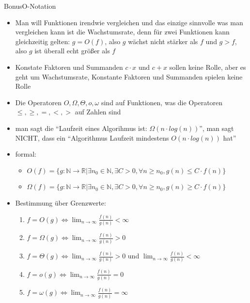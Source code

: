\begin{frame}[allowframebreaks]{Bonus}{O-Notation}
  \begin{itemize}
    \item Man will Funktionen irendwie vergleichen und das einzige sinnvolle was man vergleichen kann ist die \alert{Wachstumsrate}, denn für zwei Funktionen kann gleichzeitig gelten: $g = O(f)$, also $g$ wächst nicht stärker als $f$ und $g > f$, also $g$ ist überall echt größer als $f$
    \item Konstate Faktoren und Summanden $c \cdot x$ und $c + x$ sollen keine Rolle, aber es geht um \alert{Wachstumsrate}, Konstante Faktoren und Summanden spielen keine Rolle
    \item Die Operatoren $O, \Omega, \Theta, o, \omega$ sind auf Funktionen, was die Operatoren $\le, \ge, =, <, >$ auf Zahlen sind
    \item man sagt die \enquote{Laufzeit eines Algorihmus ist: $\Omega(n\cdot log(n))$}, man sagt \alert{NICHT}, dass ein \enquote{Algorithmus Laufzeit mindestens $O(n\cdot log(n))$ hat}
    \item \alert{formal:} 
    \begin{itemize}
      \item $O(f)= \{g: \mathbb{N}\to\mathbb{R} | \exists n_0\in\mathbb{N}, \exists C > 0, \forall n\ge n_0, g(n)\le C \cdot f(n)\}$
      \item $\Omega(f)= \{g: \mathbb{N}\to\mathbb{R} | \exists n_0\in\mathbb{N}, \exists C > 0, \forall n\ge n_0, g(n)\ge C \cdot f(n)\}$
    \end{itemize}
    \item \alert{Bestimmung über Grenzwerte:}
    \begin{enumerate}
      \item $\displaystyle f=O(g) \Leftrightarrow \operatorname{lim}_{n\to\infty}\frac{f(n)}{g(n)} < \infty$
      \item $\displaystyle f=\Omega(g) \Leftrightarrow \operatorname{lim}_{n\to\infty}\frac{f(n)}{g(n)} > 0$
      \item $\displaystyle f=\Theta(g) \Leftrightarrow \operatorname{lim}_{n\to\infty}\frac{f(n)}{g(n)} > 0$ und $\displaystyle\operatorname{lim}_{n\to\infty}\frac{f(n)}{g(n)} < \infty$
      \item $\displaystyle f=o(g) \Leftrightarrow \operatorname{lim}_{n\to\infty}\frac{f(n)}{g(n)} = 0$
      \item $\displaystyle f=\omega(g) \Leftrightarrow \operatorname{lim}_{n\to\infty}\frac{f(n)}{g(n)} = \infty$
    \end{enumerate}
  \end{itemize}
\end{frame}

